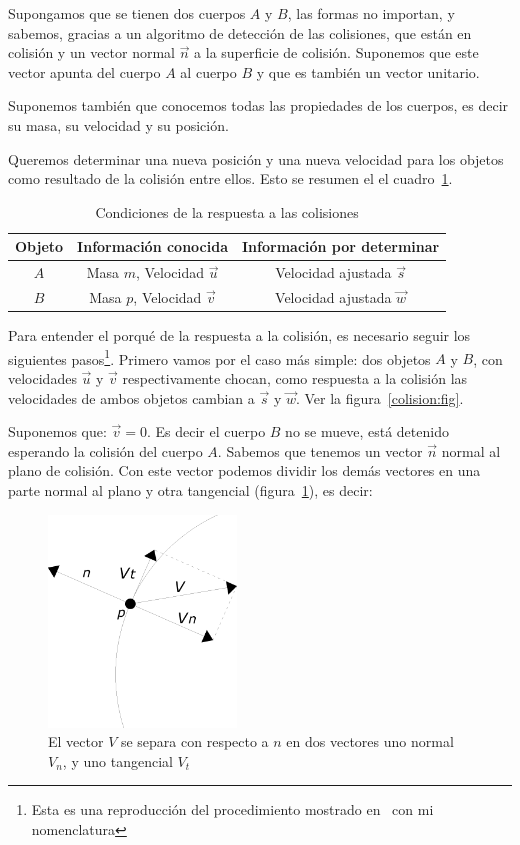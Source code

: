Supongamos que se tienen dos cuerpos $A$ y $B$, las formas no importan, y sabemos, gracias a un algoritmo de detección de las colisiones, que están en colisión y  un vector normal $\vec{n}$ a la superficie de colisión. Suponemos que este vector apunta del cuerpo $A$ al cuerpo $B$ y que es también un vector unitario.

Suponemos también que conocemos todas las propiedades de los cuerpos, es decir su masa, su velocidad y su posición.

Queremos determinar una nueva posición y una nueva velocidad para los objetos como resultado de la colisión entre ellos. Esto se resumen el el cuadro~\ref{condiciones:Colision}.
\begin{table}
\caption{Condiciones de la respuesta a las colisiones}
\label{condiciones:Colision}
\begin{center}
\begin{tabular} {|c|c|c|} \hline
Objeto & Información conocida & Información por determinar \\ \hline
$A$ & Masa $m$, Velocidad $\vec{u}$ & Velocidad ajustada $\vec{s}$ \\
$B$ & Masa $p$, Velocidad $\vec{v}$ & Velocidad ajustada $\vec{w}$ \\ \hline
\end{tabular}
\end{center}
\end{table}

Para entender el porqué de la respuesta a la colisión, es necesario seguir los siguientes pasos\footnote{Esta es una reproducción del procedimiento mostrado en~\cite{FisicaMatematicasVideojuegos} con mi nomenclatura}. Primero vamos por el caso más simple: dos objetos $A$ y $B$, con velocidades $\vec{u}$ y $\vec{v}$ respectivamente chocan, como respuesta a la colisión las velocidades de ambos objetos cambian a $\vec{s}$ y $\vec{w}$. Ver la figura~\ref{colision:fig}.

Suponemos que: $\vec{v} = 0$. Es decir el cuerpo $B$ no se mueve, está detenido esperando la colisión del cuerpo $A$. Sabemos que tenemos un vector $\vec{n}$ normal al plano de colisión. Con este vector podemos dividir los demás vectores en una parte normal al plano y otra tangencial  (figura~\ref{comVec:fig}), es decir:

\begin{figure}
 \centering
 \includegraphics[width=5cm]{Img/vector_componente}
 \caption[Separar componente tangencial y normal de un vector]{ 
 El vector $V$ se separa con respecto a $n$ en dos vectores uno normal $V_n$, y uno tangencial $V_t$ 
 } \label{comVec:fig}
\end{figure}


